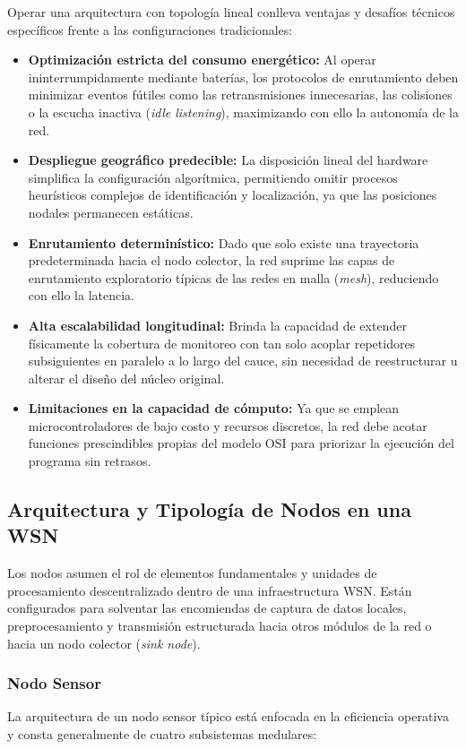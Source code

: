 Operar una arquitectura con topología lineal conlleva ventajas y desafíos técnicos específicos frente a las configuraciones tradicionales:

\begin{itemize}
    \item \textbf{Optimización estricta del consumo energético:} Al operar ininterrumpidamente mediante baterías, los protocolos de enrutamiento deben minimizar eventos fútiles como las retransmisiones innecesarias, las colisiones o la escucha inactiva (\textit{idle listening}), maximizando con ello la autonomía de la red.
    \item \textbf{Despliegue geográfico predecible:} La disposición lineal del hardware simplifica la configuración algorítmica, permitiendo omitir procesos heurísticos complejos de identificación y localización, ya que las posiciones nodales permanecen estáticas.
    \item \textbf{Enrutamiento determinístico:} Dado que solo existe una trayectoria predeterminada hacia el nodo colector, la red suprime las capas de enrutamiento exploratorio típicas de las redes en malla (\textit{mesh}), reduciendo con ello la latencia.
    \item \textbf{Alta escalabilidad longitudinal:} Brinda la capacidad de extender físicamente la cobertura de monitoreo con tan solo acoplar repetidores subsiguientes en paralelo a lo largo del cauce, sin necesidad de reestructurar u alterar el diseño del núcleo original.
    \item \textbf{Limitaciones en la capacidad de cómputo:} Ya que se emplean microcontroladores de bajo costo y recursos discretos, la red debe acotar funciones prescindibles propias del modelo OSI para priorizar la ejecución del programa sin retrasos.
\end{itemize}

\subsection{Arquitectura y Tipología de Nodos en una WSN}

Los nodos asumen el rol de elementos fundamentales y unidades de procesamiento descentralizado dentro de una infraestructura WSN. Están configurados para solventar las encomiendas de captura de datos locales, preprocesamiento y transmisión estructurada hacia otros módulos de la red o hacia un nodo colector (\textit{sink node}).

\subsubsection*{Nodo Sensor}
La arquitectura de un nodo sensor típico está enfocada en la eficiencia operativa y consta generalmente de cuatro subsistemas medulares:


